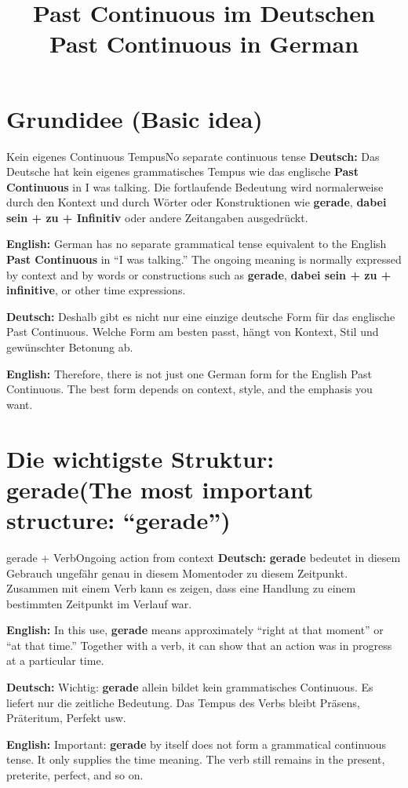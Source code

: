 \documentclass[a4paper,11pt]{article}
\title{Past Continuous im Deutschen\\\large\textnormal{Past Continuous in German}}
\date{}
\newcommand{\GermanText}[1]{\textbf{Deutsch: }#1\par}
\newcommand{\EnglishText}[1]{{\small\color{SoftGray}\textbf{English: }#1\par}}
\begin{document}
    \maketitle
    \tableofcontents
    \newpage

    \section{Grundidee \textnormal{(Basic idea)}}

        \begin{grammarentry}{Kein eigenes Continuous Tempus}{No separate continuous tense}
            \GermanText{Das Deutsche hat kein eigenes grammatisches Tempus wie das englische \textbf{Past Continuous} in \glqq I was talking\grqq. Die fortlaufende Bedeutung wird normalerweise durch den Kontext und durch Wörter oder Konstruktionen wie \textbf{gerade}, \textbf{dabei sein + zu + Infinitiv} oder andere Zeitangaben ausgedrückt.}
            \EnglishText{German has no separate grammatical tense equivalent to the English \textbf{Past Continuous} in ``I was talking.'' The ongoing meaning is normally expressed by context and by words or constructions such as \textbf{gerade}, \textbf{dabei sein + zu + infinitive}, or other time expressions.}

            \GermanText{Deshalb gibt es nicht nur eine einzige deutsche Form für das englische Past Continuous. Welche Form am besten passt, hängt von Kontext, Stil und gewünschter Betonung ab.}
            \EnglishText{Therefore, there is not just one German form for the English Past Continuous. The best form depends on context, style, and the emphasis you want.}
        \end{grammarentry}

    \section{Die wichtigste Struktur: \glqq gerade\grqq \textnormal{(The most important structure: ``gerade'')}}

        \begin{grammarentry}{gerade + Verb}{Ongoing action from context}
            \GermanText{\textbf{gerade} bedeutet in diesem Gebrauch ungefähr \glqq genau in diesem Moment\grqq oder \glqq zu diesem Zeitpunkt\grqq. Zusammen mit einem Verb kann es zeigen, dass eine Handlung zu einem bestimmten Zeitpunkt im Verlauf war.}
            \EnglishText{In this use, \textbf{gerade} means approximately ``right at that moment'' or ``at that time.'' Together with a verb, it can show that an action was in progress at a particular time.}

            \GermanText{Wichtig: \textbf{gerade} allein bildet kein grammatisches Continuous. Es liefert nur die zeitliche Bedeutung. Das Tempus des Verbs bleibt Präsens, Präteritum, Perfekt usw.}
            \EnglishText{Important: \textbf{gerade} by itself does not form a grammatical continuous tense. It only supplies the time meaning. The verb still remains in the present, preterite, perfect, and so on.}
        \end{grammarentry}
\end{document}
